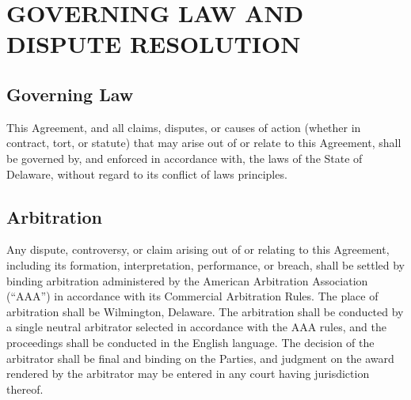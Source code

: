\section{GOVERNING LAW AND DISPUTE RESOLUTION}

\subsection{Governing Law}
This Agreement, and all claims, disputes, or causes of action (whether in contract, tort, or statute) that may arise out of or relate to this Agreement, shall be governed by, and enforced in accordance with, the laws of the State of Delaware, without regard to its conflict of laws principles.

\subsection{Arbitration}
Any dispute, controversy, or claim arising out of or relating to this Agreement, including its formation, interpretation, performance, or breach, shall be settled by binding arbitration administered by the American Arbitration Association (``AAA'') in accordance with its Commercial Arbitration Rules. The place of arbitration shall be Wilmington, Delaware. The arbitration shall be conducted by a single neutral arbitrator selected in accordance with the AAA rules, and the proceedings shall be conducted in the English language. The decision of the arbitrator shall be final and binding on the Parties, and judgment on the award rendered by the arbitrator may be entered in any court having jurisdiction thereof.
